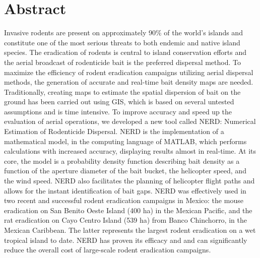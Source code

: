 \section{Abstract}

Invasive rodents are present on approximately 90\% of the world’s islands and constitute one of the most serious threats to both endemic and native island species. The eradication of rodents is central to island conservation efforts and the aerial broadcast of rodenticide bait is the preferred dispersal method. To maximize the efficiency of rodent eradication campaigns utilizing aerial dispersal methods, the generation of accurate and real-time bait density maps are needed. Traditionally, creating maps to estimate the spatial dispersion of bait on the ground has been carried out using GIS, which is based on several untested assumptions and is time intensive. To improve accuracy and speed up the evaluation of aerial operations, we developed a new tool called NERD: Numerical Estimation of Rodenticide Dispersal. NERD is the implementation of a mathematical model, in the computing language of MATLAB, which performs calculations with increased accuracy, displaying results almost in real-time. At its core, the model is a probability density function describing bait density as a function of the aperture diameter of the bait bucket, the helicopter speed, and the wind speed. NERD also facilitates the planning of helicopter flight paths and allows for the instant identification of bait gaps. NERD was effectively used in two recent and successful rodent eradication campaigns in Mexico: the mouse eradication on San Benito Oeste Island (400 ha) in the Mexican Pacific, and the rat eradication on Cayo Centro Island (539 ha) from Banco Chinchorro, in the Mexican Caribbean. The latter represents the largest rodent eradication on a wet tropical island to date. NERD has proven its efficacy and and can significantly reduce the overall cost of large-scale rodent eradication campaigns.
